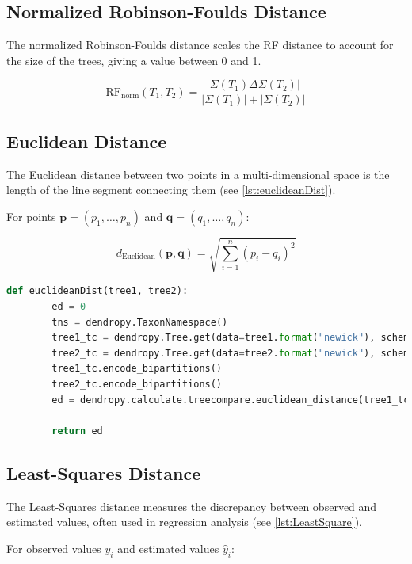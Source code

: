 \subsection{Normalized Robinson-Foulds Distance}\label{RFnorm}
The normalized Robinson-Foulds distance scales the RF distance to account for the size of the trees, giving a value between 0 and 1.

\[ \text{RF}_{\text{norm}}(T_1, T_2) = \frac{| \Sigma(T_1) \Delta \Sigma(T_2) |}{| \Sigma(T_1) | + | \Sigma(T_2) |} \]

\subsection{Euclidean Distance}\label{euclidean}
The Euclidean distance between two points in a multi-dimensional space is the length of the line segment connecting them (see \autoref{lst:euclideanDist}).

For points \( \mathbf{p} = (p_1, \ldots, p_n) \) and \( \mathbf{q} = (q_1, \ldots, q_n) \):

\[ d_{\text{Euclidean}}(\mathbf{p}, \mathbf{q}) = \sqrt{\sum_{i=1}^{n} (p_i - q_i)^2} \]

\begin{lstlisting}[label=lst:euclideanDist,language=Python,caption=Python script for calculating the Euclidean distance distance using the ete3 package in aPhyloGeo package]
    def euclideanDist(tree1, tree2):
        ed = 0
        tns = dendropy.TaxonNamespace()
        tree1_tc = dendropy.Tree.get(data=tree1.format("newick"), schema="newick", taxon_namespace=tns)
        tree2_tc = dendropy.Tree.get(data=tree2.format("newick"), schema="newick", taxon_namespace=tns)
        tree1_tc.encode_bipartitions()
        tree2_tc.encode_bipartitions()
        ed = dendropy.calculate.treecompare.euclidean_distance(tree1_tc, tree2_tc)

        return ed
\end{lstlisting}

\subsection{Least-Squares Distance}\label{LS}
The Least-Squares distance measures the discrepancy between observed and estimated values, often used in regression analysis (see \autoref{lst:LeastSquare}).

For observed values \( y_i \) and estimated values \( \hat{y}_i \):

